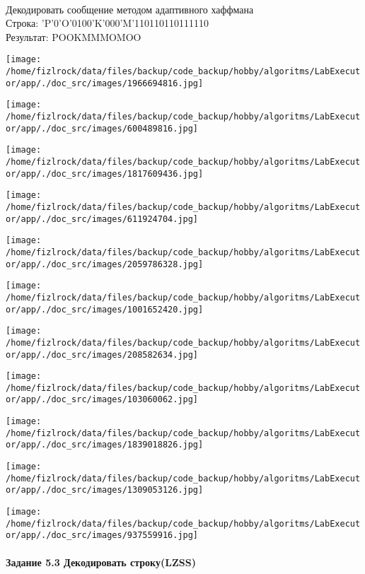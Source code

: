 \documentclass[a4paper, 12pt]{article}
\begin{document}
\\ 

Декодировать сообщение методом адаптивного хаффмана \\
Строка: 
'P'0'O'0100'K'000'M'110110110111110\\
Результат: POOKMMMOMOO

\texttt{[image: /home/fizlrock/data/files/backup/code\_backup/hobby/algoritms/LabExecutor/app/./doc\_src/images/1966694816.jpg]}

\texttt{[image: /home/fizlrock/data/files/backup/code\_backup/hobby/algoritms/LabExecutor/app/./doc\_src/images/600489816.jpg]}

\texttt{[image: /home/fizlrock/data/files/backup/code\_backup/hobby/algoritms/LabExecutor/app/./doc\_src/images/1817609436.jpg]}

\texttt{[image: /home/fizlrock/data/files/backup/code\_backup/hobby/algoritms/LabExecutor/app/./doc\_src/images/611924704.jpg]}

\texttt{[image: /home/fizlrock/data/files/backup/code\_backup/hobby/algoritms/LabExecutor/app/./doc\_src/images/2059786328.jpg]}

\texttt{[image: /home/fizlrock/data/files/backup/code\_backup/hobby/algoritms/LabExecutor/app/./doc\_src/images/1001652420.jpg]}

\texttt{[image: /home/fizlrock/data/files/backup/code\_backup/hobby/algoritms/LabExecutor/app/./doc\_src/images/208582634.jpg]}

\texttt{[image: /home/fizlrock/data/files/backup/code\_backup/hobby/algoritms/LabExecutor/app/./doc\_src/images/103060062.jpg]}

\texttt{[image: /home/fizlrock/data/files/backup/code\_backup/hobby/algoritms/LabExecutor/app/./doc\_src/images/1839018826.jpg]}

\texttt{[image: /home/fizlrock/data/files/backup/code\_backup/hobby/algoritms/LabExecutor/app/./doc\_src/images/1309053126.jpg]}

\texttt{[image: /home/fizlrock/data/files/backup/code\_backup/hobby/algoritms/LabExecutor/app/./doc\_src/images/937559916.jpg]}
\pagebreak
\paragraph{Задание 5.3 Декодировать строку(LZSS)\\}
\end{document}
